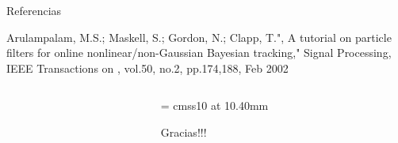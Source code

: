 \documentclass[fleqn,xcolor=dvipsnames,8pt]{beamer} %
\begin{document}
\begin{frame}{Referencias}
\begin{thebibliography}{1}
Arulampalam, M.S.; Maskell, S.; Gordon, N.; Clapp, T.", A tutorial on particle filters for online nonlinear/non-Gaussian Bayesian tracking," Signal Processing, IEEE Transactions on , vol.50, no.2, pp.174,188, Feb 2002
\end{thebibliography}
\end{frame}
\begin{frame}[plain]

  \begin{columns}
    \begin{column}{0.4\textwidth}
      \begin{center}
      \end{center}
    \end{column}
    \begin{column}{0.75\textwidth}
      \begin{center}

        \font\endfont = cmss10 at 10.40mm
        \color{Blue}
        \endfont 
        \baselineskip 20.0mm

        Gracias!!!

      \end{center}    

    \end{column}
  \end{columns}

\end{frame}
\end{document}
